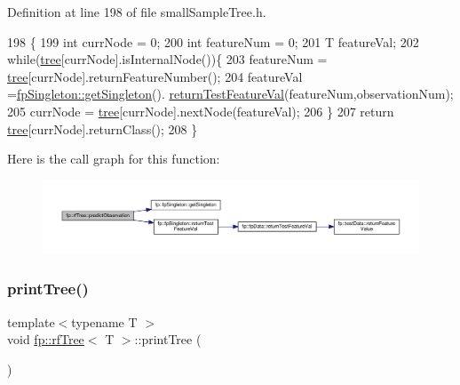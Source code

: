 Definition at line 198 of file small\+Sample\+Tree.\+h.


\begin{DoxyCode}
198                                                           \{
199                     \textcolor{keywordtype}{int} currNode = 0;
200                     \textcolor{keywordtype}{int} featureNum = 0;
201                     T featureVal;
202                     \textcolor{keywordflow}{while}(\hyperlink{classfp_1_1rfTree_a1d5c209715f4044a85878c17e2b3ee53}{tree}[currNode].isInternalNode())\{
203                         featureNum = \hyperlink{classfp_1_1rfTree_a1d5c209715f4044a85878c17e2b3ee53}{tree}[currNode].returnFeatureNumber();
204                         featureVal =\hyperlink{classfp_1_1fpSingleton_a8bdae77b68521003e3fc630edec2e240}{fpSingleton::getSingleton}().
      \hyperlink{classfp_1_1fpSingleton_ad74b421d65b17ba924244bff31fc9db6}{returnTestFeatureVal}(featureNum,observationNum);
205                         currNode = \hyperlink{classfp_1_1rfTree_a1d5c209715f4044a85878c17e2b3ee53}{tree}[currNode].nextNode(featureVal);
206                     \}
207                     \textcolor{keywordflow}{return} \hyperlink{classfp_1_1rfTree_a1d5c209715f4044a85878c17e2b3ee53}{tree}[currNode].returnClass();
208                 \}
\end{DoxyCode}
Here is the call graph for this function\+:
\nopagebreak
\begin{figure}[H]
\begin{center}
\leavevmode
\includegraphics[width=350pt]{classfp_1_1rfTree_aad66c44e2062c163b1560f9bf1bd759f_cgraph}
\end{center}
\end{figure}
\mbox{\label{classfp_1_1rfTree_a89d982d5df6e068079d2fff5f6c15f58}} 
\subsubsection{\texorpdfstring{print\+Tree()}{printTree()}\hspace{0.1cm}{\footnotesize\ttfamily [1/2]}}
{\footnotesize\ttfamily template$<$typename T $>$ \\
void \hyperlink{classfp_1_1rfTree}{fp\+::rf\+Tree}$<$ T $>$\+::print\+Tree (\begin{DoxyParamCaption}{ }\end{DoxyParamCaption})\hspace{0.3cm}{\ttfamily [inline]}}



